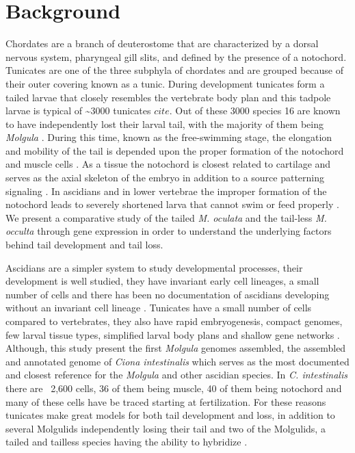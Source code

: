 \chapter{Background}
Chordates are a branch of deuterostome that are characterized by a dorsal nervous system, pharyngeal gill slits, and defined by the presence of a notochord. Tunicates are one of the three subphyla of chordates and are grouped because of their outer covering known as a tunic. During development tunicates form a tailed larvae that closely resembles the vertebrate body plan \cite{jeffery_minireview_2002} and this tadpole larvae is typical of \textasciitilde 3000 tunicates \(cite\). Out of these 3000 species 16 are known to have independently lost their larval tail, with the majority of them being \textit{Molgula} \cite{berrill_studies_1931,swalla_interspecific_1990}. During this time, known as the free-swimming stage, the elongation and mobility of the tail is depended upon the proper formation of the notochord and muscle cells \cite{satoh_ascidian_2003}. As a tissue the notochord is closest related to cartilage and serves as the axial skeleton of the embryo in addition to a source patterning signaling \cite{jeffery_evolution_1999}. In ascidians and in lower vertebrae the improper formation of the notochord leads to severely shortened larva that cannot swim or feed properly \cite{di_gregorio_tail_2002,jiang_ascidian_2005,stemple_structure_2005}. We present a comparative study of the tailed \textit{M. oculata} and the tail-less \textit{M. occulta} through gene expression in order to understand the underlying factors behind tail development and tail loss.

Ascidians are a simpler system to study developmental processes, their development is well studied, they have invariant early cell lineages, a small number of cells \cite{lemaire_evolutionary_2011} and there has been no documentation of ascidians developing without an invariant cell lineage \cite{lemaire_ascidians_2008}. Tunicates have a small number of cells compared to vertebrates, they also have rapid embryogenesis, compact genomes, few larval tissue types, simplified larval body plans and shallow gene networks \cite{corbo_characterization_1997,jeffery_minireview_2002,dehal_draft_2002}. Although, this study present the first \textit{Molgula} genomes assembled, the assembled and annotated genome of \textit{Ciona intestinalis} which serves as the most documented and closest reference for the \textit{Molgula} and other ascidian species. In \textit{C. intestinalis} there are ~2,600 cells, 36 of them being muscle, 40 of them being notochord and many of these cells have be traced starting at fertilization. For these reasons tunicates make great models for both tail development and loss, in addition to several Molgulids independently losing their tail and two of the Molgulids, a tailed and tailless species having the ability to hybridize \cite{jeffery_evolutionary_1991}. 


